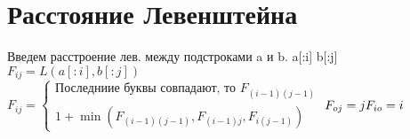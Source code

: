 \documentclass[a4paper,12pt]{article}
\theoremstyle{plain} %
\theoremstyle{definition} %
\theoremstyle{remark} %
\begin{document}
\section{Расстояние Левенштейна}
Введем расстроение лев. между подстроками a и b. 
a[:i] b[:j]
$F_{ij} = L(a[:i], b[:j])$\\
$F_{ij}=
\begin{cases}
\text{Последниие буквы совпадают, то } F_{(i-1)(j-1)}\\
1+\min(F_{(i-1)(j-1)}, F_{(i-1)j}, F_{i(j-1)})
\end{cases}
$
$F_{oj}=j\\
F_{io}=i
$






















\begin{comment}
\begin{center}
	\vfill \emph{{\small Г. С. Демьянов, \href{https://vk.com/id37346992}{VK}\\
С. С. Клявинек, \href{https://vk.com/id85132547}{VK}
}}
\end{center}
\end{comment}
\end{document}
